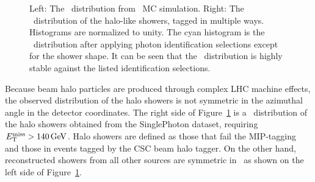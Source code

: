 \begin{figure}[htbp]
  \centering
  \caption{
    Left: The \phig\ distribution from \zinvg\ MC simulation. \qquad \qquad
    Right: The \phig\ distribution of the halo-like showers, tagged in multiple ways. 
    Histograms are normalized to unity.
    The cyan histogram is the \phig\ distribution after applying photon identification selections except for the shower shape. 
    It can be seen that the \phig\ distribution is highly stable against the listed identification selections.
  }
  \label{fig:halophi}
\end{figure}

Because beam halo particles are produced through complex LHC machine effects, the observed distribution of the halo showers is not
symmetric in the azimuthal angle in the detector coordinates.
The right side of Figure~\ref{fig:halophi} is a \phig\ distribution of the halo showers obtained from the SinglePhoton dataset, requiring $E_{\mathrm{T}}^{\text{miss}} > 140\,\text{Ge\hspace{-.08em}V}$. 
Halo showers are defined as those that fail the MIP-tagging and those in events tagged by the CSC beam halo tagger.
On the other hand, reconstructed showers from all other sources are symmetric in \phig\, as shown on the left side of Figure~\ref{fig:halophi}. 

